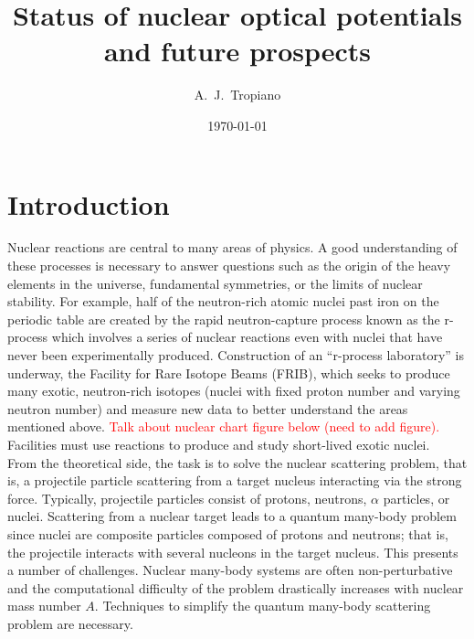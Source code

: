 \documentclass[preprintnumbers,floatfix,aps,prc,preprint,nofootinbib]{revtex4-1}
\begin{document}
\title{Status of nuclear optical potentials and future prospects}


\author{A.~J.~Tropiano}


\date{\today}

\maketitle

\newpage


\section{Introduction}
\label{sec:intro}


Nuclear reactions are central to many areas of physics. A good understanding of these processes is necessary to answer questions such as the origin of the heavy elements in the universe, fundamental symmetries, or the limits of nuclear stability. For example, half of the neutron-rich atomic nuclei past iron on the periodic table are created by the rapid neutron-capture process known as the r-process which involves a series of nuclear reactions even with nuclei that have never been experimentally produced. Construction of an ``r-process laboratory'' is underway, the Facility for Rare Isotope Beams (FRIB), which seeks to produce many exotic, neutron-rich isotopes (nuclei with fixed proton number and varying neutron number) and measure new data to better understand the areas mentioned above. \textcolor{red}{Talk about nuclear chart figure below (need to add figure).} Facilities must use reactions to produce and study short-lived exotic nuclei.
\\

From the theoretical side, the task is to solve the nuclear scattering problem, that is, a projectile particle scattering from a target nucleus interacting via the strong force. Typically, projectile particles consist of protons, neutrons, $\alpha$ particles, or nuclei. Scattering from a nuclear target leads to a quantum many-body problem since nuclei are composite particles composed of protons and neutrons; that is, the projectile interacts with several nucleons in the target nucleus. This presents a number of challenges. Nuclear many-body systems are often non-perturbative and the computational difficulty of the problem drastically increases with nuclear mass number $A$. Techniques to simplify the quantum many-body scattering problem are necessary.
\\
\end{document}
